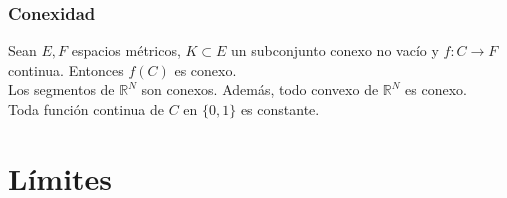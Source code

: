 \documentclass[11pt,titlepage,a4paper]{article}
\begin{document}
\subsubsection*{Conexidad}
Sean $E,F$ espacios métricos, $K\subset E$ un subconjunto conexo no vacío y $f:C\to F$ continua. 
Entonces $f(C)$ es conexo.\\
Los segmentos de $\mathbb{R}^N$ son conexos. Además, todo convexo de $\mathbb{R}^N$ es conexo.\\
Toda función continua de $C$ en $\{0,1\}$ es constante.

\section{Límites}
\end{document}
